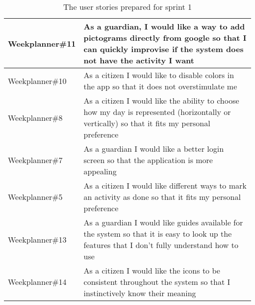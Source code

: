 \begin{table}[tbp]
\begin{tabular}{|p{}|p{}|}
    Weekplanner\#11 & As a guardian, I would like a way to add pictograms directly from google so that I can quickly improvise if the system does not have the activity I want                                     \\ \hline
    Weekplanner\#10 & As a citizen I would like to disable colors in the app so that it does not overstimulate me                                                                                                  \\ \hline
    Weekplanner\#8  & As a citizen I would like the ability to choose how my day is represented (horizontally or vertically) so that it fits my personal preference                                                \\ \hline
    Weekplanner\#7  & As a guardian I would like a better login screen so that the application is more appealing                                                                                                   \\ \hline
    Weekplanner\#5  & As a citizen I would like different ways to mark an activity as done so that it fits my personal preference                                                                                  \\ \hline
    Weekplanner\#13 & As a guardian I would like guides available for the system so that it is easy to look up the features that I don't fully understand how to use                                               \\ \hline
    Weekplanner\#14 & As a citizen I would like the icons to be consistent throughout the system so that I instinctively know their meaning                                                                        \\ \hline
    \end{tabular}
    \caption{The user stories prepared for sprint 1}
    \label{User-stories-for-first-sprint}
\end{table}